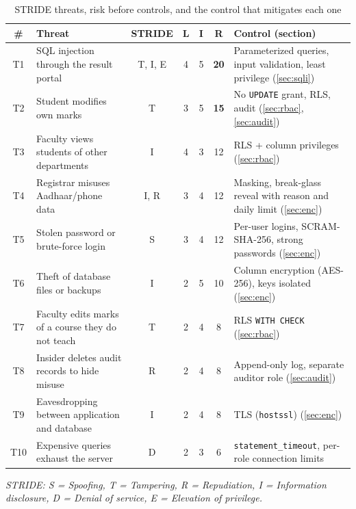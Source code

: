 \documentclass[11pt,a4paper]{report}
\begin{document}
\begin{table}[H]
    \centering
    \caption{STRIDE threats, risk before controls, and the control that mitigates each one}
    \label{tab:stride}
    \footnotesize
    \begin{tabularx}{\textwidth}{|c|Y|c|c|c|c|Y|}
        \hline
        \textbf{\#} & \textbf{Threat} & \textbf{STRIDE} & \textbf{L} & \textbf{I} & \textbf{R} & \textbf{Control (section)} \\ \hline
        T1 & SQL injection through the result portal & T, I, E & 4 & 5 & \textbf{20} & Parameterized queries, input validation, least privilege (\ref{sec:sqli}) \\ \hline
        T2 & Student modifies own marks & T & 3 & 5 & \textbf{15} & No \texttt{UPDATE} grant, RLS, audit (\ref{sec:rbac}, \ref{sec:audit}) \\ \hline
        T3 & Faculty views students of other departments & I & 4 & 3 & 12 & RLS + column privileges (\ref{sec:rbac}) \\ \hline
        T4 & Registrar misuses Aadhaar/phone data & I, R & 3 & 4 & 12 & Masking, break-glass reveal with reason and daily limit (\ref{sec:enc}) \\ \hline
        T5 & Stolen password or brute-force login & S & 3 & 4 & 12 & Per-user logins, SCRAM-SHA-256, strong passwords (\ref{sec:enc}) \\ \hline
        T6 & Theft of database files or backups & I & 2 & 5 & 10 & Column encryption (AES-256), keys isolated (\ref{sec:enc}) \\ \hline
        T7 & Faculty edits marks of a course they do not teach & T & 2 & 4 & 8 & RLS \texttt{WITH CHECK} (\ref{sec:rbac}) \\ \hline
        T8 & Insider deletes audit records to hide misuse & R & 2 & 4 & 8 & Append-only log, separate auditor role (\ref{sec:audit}) \\ \hline
        T9 & Eavesdropping between application and database & I & 2 & 4 & 8 & TLS (\texttt{hostssl}) (\ref{sec:enc}) \\ \hline
        T10 & Expensive queries exhaust the server & D & 2 & 3 & 6 & \texttt{statement\_timeout}, per-role connection limits \\ \hline
    \end{tabularx}
\end{table}
\noindent\textit{STRIDE: S = Spoofing, T = Tampering, R = Repudiation, I = Information disclosure, D = Denial of service, E = Elevation of privilege.}
\end{document}
